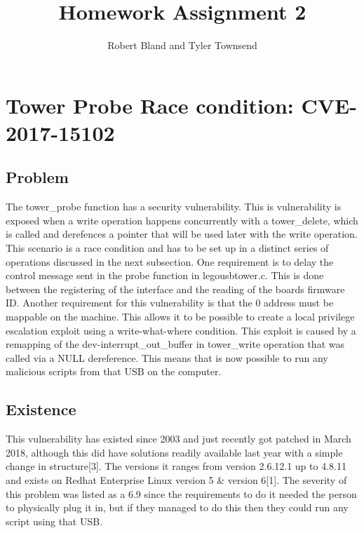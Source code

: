 \documentclass[12pt]{article}
\author{Robert Bland and Tyler Townsend}
\title{Homework Assignment 2}
\begin{document}
\maketitle

\section{Tower Probe Race condition: CVE-2017-15102} 

\subsection{Problem}
The tower\_probe function has a security vulnerability. This is vulnerability is exposed when a write operation happens concurrently with a tower\_delete, which is called and derefences a pointer that will be used later with the write operation. This scenario is a race condition and has to be set up in a distinct series of operations discussed in the next subsection.  One requirement is to delay the control message sent in the probe function in legousbtower.c. This is done between the registering of the interface and the reading of the boards firmware ID. Another requirement for this vulnerability is that the 0 address must be mappable on the machine. This allows it to be possible to create a local privilege escalation exploit using a write-what-where condition. This exploit is caused by a remapping of the dev-interrupt\_out\_buffer in tower\_write operation that was called via a NULL dereference. This means that is now possible to run any malicious scripts from that USB on the computer. 

\subsection{Existence}
This vulnerability has existed since 2003 and just recently got patched in March 2018, although this did have solutions readily available last year with a simple change in structure[3]. The versions it ranges from version 2.6.12.1 up to 4.8.11 and exists on Redhat Enterprise Linux version 5 \& version 6[1]. The severity of this problem was listed as a 6.9 since the requirements to do it needed the person to physically plug it in, but if they managed to do this then they could run any script using that USB\cite{NVD}.
\end{document}
